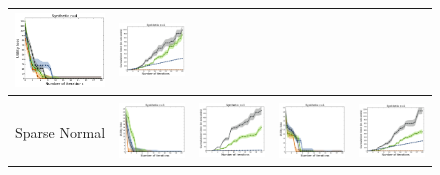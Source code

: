 \documentclass{article}
\renewcommand\[{\begin{equation}}
\renewcommand\]{\end{equation}}
\begin{document}
\begin{figure}[t]
{\begin{tabular}{ccccc}
        \includegraphics[align=c,width=10em]{figures/synthetic_vs_others_4_uniform_sparse_per_iter_loss} &
        \includegraphics[align=c,width=10em]{figures/synthetic_vs_others_4_uniform_sparse_per_iter_time}
        \\
        \hline
        \\
        {\sc Sparse Normal} &
        \includegraphics[align=c,width=10em]{figures/synthetic_vs_others_3_normal_sparse_per_iter_loss} &
        \includegraphics[align=c,width=10em]{figures/synthetic_vs_others_3_normal_sparse_per_iter_time} &
        \includegraphics[align=c,width=10em]{figures/synthetic_vs_others_4_normal_sparse_per_iter_loss} &
        \includegraphics[align=c,width=10em]{figures/synthetic_vs_others_4_normal_sparse_per_iter_time}

\end{tabular}}
\end{figure}
\end{document}
